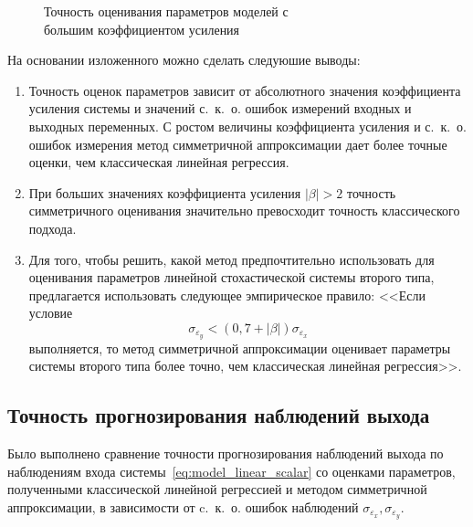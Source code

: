 \begin{figure}[p]
  \vspace{\baselineskip}
  \caption{Точность оценивания параметров моделей с \\ большим коэффициентом усиления}\label{fig:comparison_linear_params_beta-big}
\end{figure}

На основании изложенного можно сделать следуюшие выводы:
\begin{enumerate}
  \item Точность оценок параметров зависит от абсолютного значения коэффициента усиления системы и
    значений с.~к.~о. ошибок измерений входных и выходных переменных.
    С ростом величины коэффициента усиления и с.~к.~о. ошибок измерения
    метод симметричной аппроксимации дает более точные оценки,
    чем классическая линейная регрессия.
  \item При больших значениях коэффициента усиления \( |\beta| > 2 \)
    точность симметричного оценивания значительно превосходит
    точность классического подхода.
  \item Для того, чтобы решить, какой метод предпочтительно использовать для оценивания параметров
    линейной стохастической системы второго типа,
    предлагается использовать следующее эмпирическое правило:
    <<Если условие
    \begin{equation}
      \sigma_{\varepsilon_y} < (0{,}7 + |\beta|) \sigma_{\varepsilon_x}
      \label{eq:rule_linear_param}
    \end{equation}
    выполняется, то метод симметричной аппроксимации оценивает параметры системы
    второго типа более точно, чем классическая линейная регрессия>>.
\end{enumerate}

\newpage
\subsection{Точность прогнозирования наблюдений выхода}\label{subsec:linear_predict}

Было выполнено сравнение точности прогнозирования наблюдений выхода по наблюдениям входа
системы~\eqref{eq:model_linear_scalar} со оценками параметров,
полученными классической линейной регрессией и методом симметричной аппроксимации,
в зависимости от c.~к.~о. ошибок наблюдений \( \sigma_{\varepsilon_x}, \sigma_{\varepsilon_y} \).

